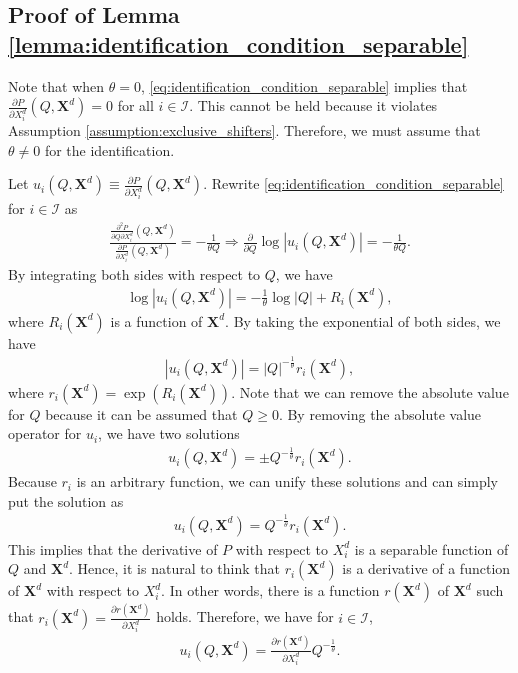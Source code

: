 \documentclass[11pt, a4paper]{article}
\begin{document}
\subsection{Proof of Lemma \ref{lemma:identification_condition_separable}}

Note that when $\theta = 0$, \eqref{eq:identification_condition_separable} implies that $\frac{\partial P}{\partial X^{d}_i}(Q, \bm{X}^{d}) = 0$ for all $i \in \mathcal{I}$.
This cannot be held because it violates Assumption \ref{assumption:exclusive_shifters}.
Therefore, we must assume that $\theta \ne 0$ for the identification.


Let $u_i(Q, \bm{X}^{d}) \equiv \frac{\partial P}{\partial X^{d}_i}(Q, \bm{X}^{d})$.
Rewrite \eqref{eq:identification_condition_separable} for $i \in \mathcal{I}$ as
\begin{align}
    \frac{\frac{\partial^2 P}{\partial Q\partial X^{d}_i}(Q, \bm{X}^{d})}{ \frac{\partial P}{\partial X^{d}_i}(Q, \bm{X}^{d}) } = - \frac{1}{\theta Q} \Longrightarrow \frac{\partial }{\partial Q}\log |u_i(Q, \bm{X}^{d})| = -\frac{1}{\theta Q}.
\end{align}
By integrating both sides with respect to $Q$, we have
\begin{align}
    \log |u_i(Q, \bm{X}^{d})| = -\frac{1}{\theta}\log |Q| + R_i(\bm{X}^{d}),
\end{align}
where $R_i(\bm{X}^{d})$ is a function of $\bm{X}^{d}$.
By taking the exponential of both sides, we have
\begin{align}
    |u_i(Q, \bm{X}^{d})| = |Q|^{-\frac{1}{\theta}}r_i(\bm{X}^{d}),
\end{align}
where $r_i(\bm{X}^{d})  = \exp(R_i(\bm{X}^{d}))$.
Note that we can remove the absolute value for $Q$ because it can be assumed that $Q\ge 0$.
By removing the absolute value operator for $u_i$, we have two solutions
\begin{align}
    u_i(Q, \bm{X}^{d}) = \pm Q^{-\frac{1}{\theta}}r_i(\bm{X}^{d}). 
\end{align}
Because $r_i$ is an arbitrary function, we can unify these solutions and can simply put the solution as
\begin{align}
    u_i(Q, \bm{X}^{d}) = Q^{-\frac{1}{\theta}}r_i(\bm{X}^{d}). 
\end{align}
This implies that the derivative of $P$ with respect to $X^{d}_i$ is a separable function of $Q$ and $\bm{X}^{d}$.
Hence, it is natural to think that $r_i(\bm{X}^{d})$ is a derivative of a function of $\bm{X}^{d}$ with respect to $X^{d}_i$.
In other words, there is a function $r(\bm{X}^{d})$ of $\bm{X}^{d}$ such that $r_i(\bm{X}^{d}) = \frac{\partial r(\bm{X}^{d})}{\partial X^{d}_i}$ holds.
Therefore, we have for $i \in \mathcal{I}$,
\begin{align}
    u_i(Q, \bm{X}^{d}) = \frac{\partial r(\bm{X}^{d})}{\partial X^{d}_i} Q^{-\frac{1}{\theta}}.
\end{align}
\end{document}
